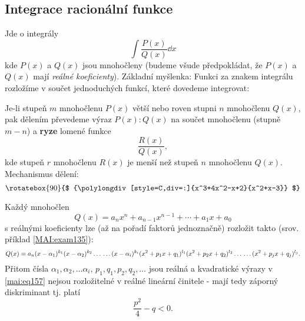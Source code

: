     \newpage
    \subsection{Integrace racionální funkce}
      Jde o integrály 
      \begin{equation}\label{mai:eq157}
        \int\dfrac{P(x)}{Q(x)}\dd{x}
      \end{equation}
      kde \(P(x)\) a \(Q(x)\) jsou mnohočleny (budeme všude předpokládat, že \(P(x)\) a \(Q(x)\)
      mají \emph{reálné koeficienty}). Základní myšlenka: Funkci za znakem integrálu rozložíme v
      součet jednoduchých funkcí, které dovedeme integrovat:
      
      Je-li stupeň \(m\) mnohočlenu \(P(x)\) větší nebo roven stupni \(n\) mnohočlenu \(Q(x)\), pak
      dělením převedeme výraz \(P(x):Q(x)\) na součet mnohočlenu (stupně \(m-n\)) a \textbf{ryze}
      lomené funkce
      \begin{equation}\label{mai:eq158}
        \dfrac{R(x)}{Q(x)},
      \end{equation}
      kde stupeň \(r\) mnohočlenu \(R(x)\) je menší než stupeň \(n\) mnohočlenu \(Q(x)\).
      Mechanismus dělení:
      \begin{equation*}
        \rotatebox{90}{$
          {\polylongdiv[style=C,div=:]{x^3+4x^2-x+2}{x^2+x-3}}
        $}
      \end{equation*}

      \begin{mdframed}[style=mdmathlemma] 
        \begin{lemma}\label{mai:lemma010}
          Každý mnohočlen
          \begin{equation*}
            Q(x) = a_nx^n + a_{n-1}x^{n-1} + \cdots + a_1x + a_0
          \end{equation*}
          s reálnými koeficienty lze (až na pořadí faktorů jednoznačně) rozložit takto (srov.
          příklad \ref{MAI:exam135}):
          \begin{equation}\label{mai:eq159}
            Q(x) = a_n(x-\alpha_1)^{k_1}(x-\alpha_2)^{k_2}\ldots                   \nonumber \\
            \ldots(x-\alpha_i)^{k_i}(x^2+p_1x+q_1)^{l_1}(x^2+p_2x+q_2)^{l_2}\ldots \nonumber \\ 
            \ldots(x^2+p_jx+q_j)^{l_j}.
          \end{equation}
          Přitom čísla \(\alpha_1, \alpha_2, \ldots \alpha_i\), \(p_1, q_1, p_2, q_2, \ldots \) jsou
          reálná a kvadratické výrazy v \ref{mai:eq157} nejsou rozložitelné v reálné lineární
          činitele - mají tedy záporný diskriminant tj. platí
          \begin{equation}\label{mai:eq160}
            \frac{p^2}{4}-q<0.
          \end{equation} 
        \end{lemma}
      \end{mdframed}

